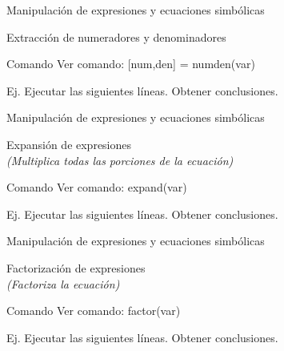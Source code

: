 \documentclass{bredelebeamer}
\begin{document}
\begin{frame}{Manipulación de expresiones y ecuaciones simbólicas}
\begin{center}
Extracción de numeradores y denominadores
\end{center}
\begin{exampleblock}{Comando}
Ver comando: [num,den] = numden(var)
\end{exampleblock}
Ej. Ejecutar las siguientes líneas. Obtener conclusiones.
\end{frame}

\begin{frame}{Manipulación de expresiones y ecuaciones simbólicas}
\begin{center}
Expansión de expresiones\\
\textit{(Multiplica todas las porciones de la ecuación)}
\end{center}
\begin{exampleblock}{Comando}
Ver comando: expand(var)
\end{exampleblock}
Ej. Ejecutar las siguientes líneas. Obtener conclusiones.
\end{frame}

\begin{frame}{Manipulación de expresiones y ecuaciones simbólicas}
\begin{center}
Factorización de expresiones\\
\textit{(Factoriza la ecuación)}
\end{center}
\begin{exampleblock}{Comando}
Ver comando: factor(var)
\end{exampleblock}
Ej. Ejecutar las siguientes líneas. Obtener conclusiones.
\end{frame}
\end{document}
